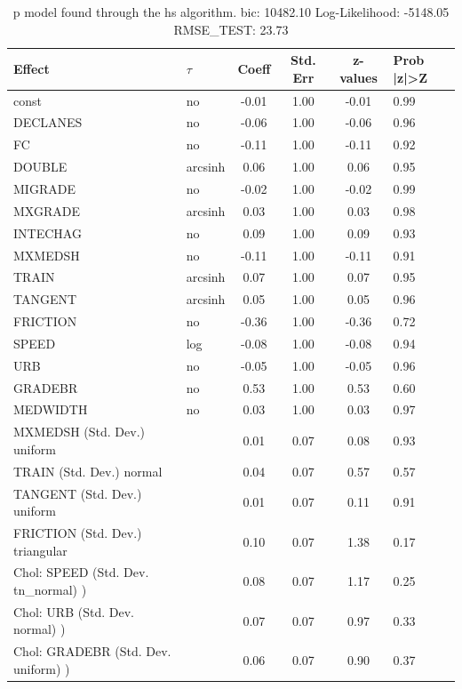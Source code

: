 \begin{table}
	\caption{p model found through the hs algorithm. bic: 10482.10 Log-Likelihood: -5148.05 RMSE_TEST: 23.73}
	\begin{center}
		\begin{tabular}{|l|l|c|c|c|l|}
			\hline
			Effect & $\tau$ & Coeff & Std. Err & z-values & Prob |z|>Z \\
			\hline
			const & no & -0.01 & 1.00 & -0.01 & 0.99 \\
			\hline
			DECLANES & no & -0.06 & 1.00 & -0.06 & 0.96 \\
			\hline
			FC & no & -0.11 & 1.00 & -0.11 & 0.92 \\
			\hline
			DOUBLE & arcsinh & 0.06 & 1.00 & 0.06 & 0.95 \\
			\hline
			MIGRADE & no & -0.02 & 1.00 & -0.02 & 0.99 \\
			\hline
			MXGRADE & arcsinh & 0.03 & 1.00 & 0.03 & 0.98 \\
			\hline
			INTECHAG & no & 0.09 & 1.00 & 0.09 & 0.93 \\
			\hline
			MXMEDSH & no & -0.11 & 1.00 & -0.11 & 0.91 \\
			\hline
			TRAIN & arcsinh & 0.07 & 1.00 & 0.07 & 0.95 \\
			\hline
			TANGENT & arcsinh & 0.05 & 1.00 & 0.05 & 0.96 \\
			\hline
			FRICTION & no & -0.36 & 1.00 & -0.36 & 0.72 \\
			\hline
			SPEED & log & -0.08 & 1.00 & -0.08 & 0.94 \\
			\hline
			URB & no & -0.05 & 1.00 & -0.05 & 0.96 \\
			\hline
			GRADEBR & no & 0.53 & 1.00 & 0.53 & 0.60 \\
			\hline
			MEDWIDTH & no & 0.03 & 1.00 & 0.03 & 0.97 \\
			\hline
			MXMEDSH (Std. Dev.) uniform &  & 0.01 & 0.07 & 0.08 & 0.93 \\
			\hline
			TRAIN (Std. Dev.) normal &  & 0.04 & 0.07 & 0.57 & 0.57 \\
			\hline
			TANGENT (Std. Dev.) uniform &  & 0.01 & 0.07 & 0.11 & 0.91 \\
			\hline
			FRICTION (Std. Dev.) triangular &  & 0.10 & 0.07 & 1.38 & 0.17 \\
			\hline
			 Chol: SPEED (Std. Dev. tn_normal) ) &  & 0.08 & 0.07 & 1.17 & 0.25 \\
			\hline
			 Chol: URB (Std. Dev. normal) ) &  & 0.07 & 0.07 & 0.97 & 0.33 \\
			\hline
			 Chol: GRADEBR (Std. Dev. uniform) ) &  & 0.06 & 0.07 & 0.90 & 0.37 \\

\end{tabular}
\end{center}
\end{table}
